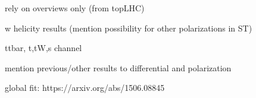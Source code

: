 

rely on overviews only (from topLHC)

w helicity results (mention possibility for other polarizations in ST)

ttbar, t,tW,s channel

mention previous/other results to differential and polarization

global fit: https://arxiv.org/abs/1506.08845~\cite{Buckley:2015nca}